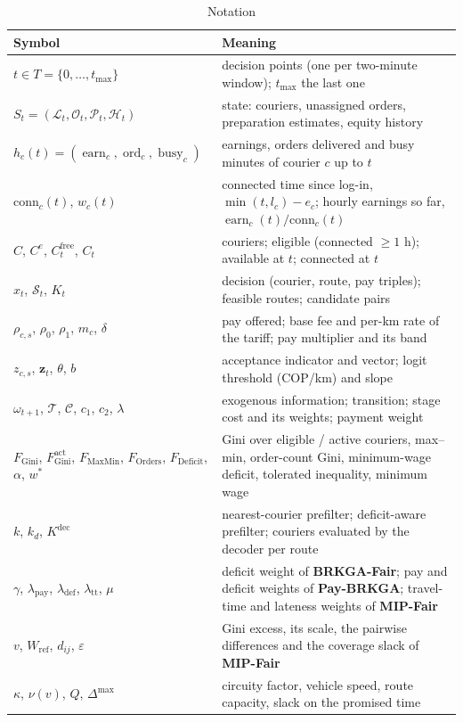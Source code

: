 \documentclass[a4paper,11pt,review,3p,authoryear]{elsarticle}
\newcommand{\Hist}{\mathcal{H}}
\newcommand{\FG}{F_{\text{Gini}}}
\newcommand{\FGa}{F_{\text{Gini}}^{\text{act}}}
\newcommand{\conn}{\mathrm{conn}}
\newcommand{\FD}{F_{\text{Deficit}}}
\newcommand{\FO}{F_{\text{Orders}}}
\newcommand{\FM}{F_{\text{MaxMin}}}
\DeclareMathOperator{\earn}{earn}
\DeclareMathOperator{\busy}{busy}
\DeclareMathOperator{\ord}{ord}
\begin{document}
\begin{table}[htbp]
\centering
\small
\begin{tabular}{>{\raggedright\arraybackslash}p{} >{\raggedright\arraybackslash}p{}}
\hline
\textbf{Symbol} & \textbf{Meaning} \\
\hline
$t \in T = \{0, \dots, t_{\max}\}$ & decision points (one per two-minute window); $t_{\max}$ the last one \\
$S_t = (\mathcal{L}_t, \mathcal{O}_t, \mathcal{P}_t, \Hist_t)$ & state: couriers, unassigned orders, preparation estimates, equity history \\
$h_c(t) = (\earn_c, \ord_c, \busy_c)$ & earnings, orders delivered and busy minutes of courier $c$ up to $t$ \\
$\conn_c(t)$, $w_c(t)$ & connected time since log-in, $\min(t, l_c) - e_c$; hourly earnings so far, $\earn_c(t)/\conn_c(t)$ \\
$C$, $C^{e}$, $C_t^{\text{free}}$, $C_t$ & couriers; eligible (connected $\ge 1$ h); available at $t$; connected at $t$ \\
$x_t$, $\mathcal{S}_t$, $K_t$ & decision (courier, route, pay triples); feasible routes; candidate pairs \\
$\rho_{c,s}$, $\rho_0$, $\rho_1$, $m_c$, $\delta$ & pay offered; base fee and per-km rate of the tariff; pay multiplier and its band \\
$z_{c,s}$, $\mathbf{z}_t$, $\theta$, $b$ & acceptance indicator and vector; logit threshold (COP/km) and slope \\
$\omega_{t+1}$, $\mathcal{T}$, $\mathcal{C}$, $c_1$, $c_2$, $\lambda$ & exogenous information; transition; stage cost and its weights; payment weight \\
$\FG$, $\FGa$, $\FM$, $\FO$, $\FD$, $\alpha$, $w^*$ & Gini over eligible / active couriers, max--min, order-count Gini, minimum-wage deficit, tolerated inequality, minimum wage \\
$k$, $k_d$, $K^{\text{dec}}$ & nearest-courier prefilter; deficit-aware prefilter; couriers evaluated by the decoder per route \\
$\gamma$, $\lambda_{\text{pay}}$, $\lambda_{\text{def}}$, $\lambda_{\text{tt}}$, $\mu$ & deficit weight of \textbf{BRKGA-Fair}; pay and deficit weights of \textbf{Pay-BRKGA}; travel-time and lateness weights of \textbf{MIP-Fair} \\
$v$, $W_{\text{ref}}$, $d_{ij}$, $\varepsilon$ & Gini excess, its scale, the pairwise differences and the coverage slack of \textbf{MIP-Fair} \\
$\kappa$, $\nu(v)$, $Q$, $\Delta^{\max}$ & circuity factor, vehicle speed, route capacity, slack on the promised time \\
\hline
\end{tabular}
\caption{Notation}
\label{tab:notation}
\end{table}
\end{document}
